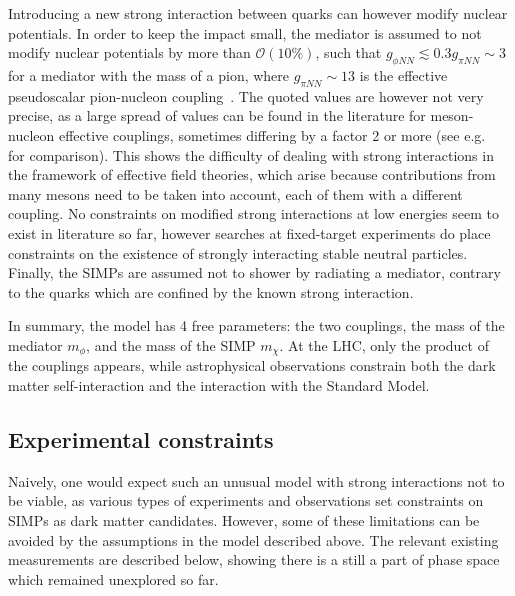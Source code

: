 Introducing a new strong interaction between quarks can however modify nuclear potentials. In order to keep the impact small, the mediator is assumed to not modify nuclear potentials by more than $\mathcal{O}(10\%)$, such that $g_{\phi NN} \lesssim 0.3g_{\pi NN}\sim 3$ for a mediator with the mass of a pion, where $g_{\pi NN} \sim 13$ is the effective pseudoscalar pion-nucleon coupling~\cite{Donoghue:1992dd}. The quoted values are however not very precise, as a large spread of values can be found in the literature for meson-nucleon effective couplings, sometimes differing by a factor 2 or more (see e.g.~\cite{Downum:2006re} for comparison). This shows the difficulty of dealing with strong interactions in the framework of effective field theories, which arise because contributions from many mesons need to be taken into account, each of them with a different coupling. No constraints on modified strong interactions at low energies seem to exist in literature so far, however searches at fixed-target experiments do place constraints on the existence of strongly interacting stable neutral particles. Finally, the \acp{SIMP} are assumed not to shower by radiating a mediator, contrary to the quarks which are confined by the known strong interaction.

In summary, the model has 4 free parameters: the two couplings, the mass of the mediator $m_{\phi}$, and the mass of the \ac{SIMP} $m_{\chi}$. At the \ac{LHC}, only the product of the couplings appears, while astrophysical observations constrain both the dark matter self-interaction and the interaction with the Standard Model.

\subsection{Experimental constraints}
\label{sec:SIMP_constraints}

Naively, one would expect such an unusual model with strong interactions not to be viable, as various types of experiments and observations set constraints on \acp{SIMP} as dark matter candidates. However, some of these limitations can be avoided by the assumptions in the model described above. The relevant existing measurements are described below, showing there is a still a part of phase space which remained unexplored so far.


